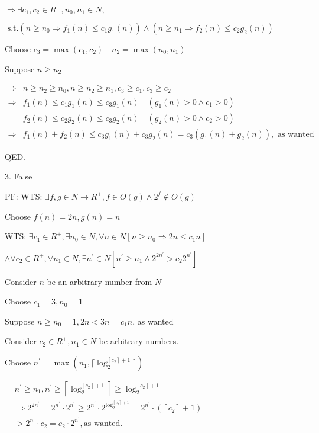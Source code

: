 \documentclass[12pt]{article}
\begin{document}
$
\Rightarrow \exists c_{1}, c_{2} \in R^{+}, n_{0}, n_{1} \in N,$ 

$\text { s.t.}\left(n \geq n_{0} \Rightarrow f_{1}(n) \leq c_{1} g_{1}(n)\right) \wedge\left(n\geq n_{1} \Rightarrow f_2(n) \leq c_{2} g_{2}(n)\right)
$

Choose $c_{3}=\max \left(c_{1}, c_{2}\right) \quad n_{2}=\max (n_0, n_1)$

Suppose $n \geq n_{2}$

$
\begin{aligned}
\Rightarrow & n \geq n_{2} \geq n_{0},  n \geq n_{2} \geq n_{1},  c_{3} \geq c_{1}, c_{3} \geq c_{2} \\
\Rightarrow & f_{1}(n) \leq c_{1} g_{1}(n) \leq c_{3} g_{1}(n) \quad\left(g_{1}(n)>0 \wedge c_{1}>0\right) \\
& f_{2}(n) \leq c_{2} g_{2}(n) \leq c_{3} g_{2}(n) \quad\left(g_{2}(n)>0 \wedge c_{2}>0\right) \\
\Rightarrow & f_{1}(n)+f_{2}(n) \leq c_{3} g_{1}(n)+c_{3} g_{2}(n)=c_{3}\left(g_{1}(n)+g_{2}(n)\right), \text { as wanted }
\end{aligned}
$

QED.

3. False


PF: WTS: $\exists f, g \in N \rightarrow R^{+}, f \in O (g) \wedge 2^{f} \notin O(g)$

Choose $f(n)=2 n, g(n)=n$

WTS: $\exists c_{1} \in R^{+}, \exists n_{0} \in N, \forall n \in N\left[n \geq n_{0} \Rightarrow 2 n \leq c_1 n\right]$

$\wedge \forall c_{2} \in R^{+}, \forall n_1 \in N, \exists n^{\prime} \in N\left[n^{\prime} \geq n_{1} \wedge 2^{2 n^{\prime}}>c_{2} 2^{n^{\prime}}\right]$

Consider $n$ be an arbitrary number from $N$

Choose $c_1=3, n_{0}=1$

Suppose $n \geq n_{0}=1, 2 n<3 n=c_1 n$, as wanted

Consider $c_{2} \in R^{+}, n_1 \in N$ be arbitrary numbers.

Choose $n^{\prime}=\max \left(n_{1},\lceil\log _{2}^{\left\lceil c_2\right\rceil+1}\rceil\right)$

$
\begin{aligned}
& n^{\prime} \geq n_{1}, n^{\prime} \geq\left\lceil\log _{2}^{\left\lceil c_2\right\rceil+1}\right\rceil\geq \log _{2}^{\left\lceil c_2\right\rceil+1} \\
& \Rightarrow 2^{2 n^{\prime}}=2^{n^{\prime}} \cdot 2^{n^{\prime}} \geq 2^{n^{\prime}} \cdot 2^{\log _{2}^{\left\lceil c_2\right\rceil+1}}=2^{n^{\prime}} \cdot\left({\left\lceil c_2\right\rceil+1}\right) \\
&>2^{n^{\prime}} \cdot c_{2}=c_{2} \cdot 2^{n^{\prime}}, \text {as wanted. }
\end{aligned}
$
\end{document}
